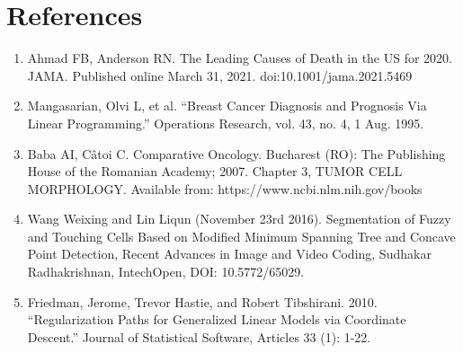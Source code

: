 \documentclass[10pt]{article}
\begin{document}
	
	 
\newpage
\section{References}

\begin{enumerate}
	\item Ahmad FB, Anderson RN. The Leading Causes of Death in the US for 2020. JAMA. Published online March 31, 2021. doi:10.1001/jama.2021.5469

	\item Mangasarian, Olvi L, et al. “Breast Cancer Diagnosis and Prognosis Via Linear Programming.” Operations Research, vol. 43, no. 4, 1 Aug. 1995. 
	
	\item Baba AI, Câtoi C. Comparative Oncology. Bucharest (RO): The Publishing House of the Romanian Academy; 2007. Chapter 3, TUMOR CELL MORPHOLOGY. Available from: https://www.ncbi.nlm.nih.gov/books
	
	\item Wang Weixing and Lin Liqun (November 23rd 2016). Segmentation of Fuzzy and Touching Cells Based on Modified Minimum Spanning Tree and Concave Point Detection, Recent Advances in Image and Video Coding, Sudhakar Radhakrishnan, IntechOpen, DOI: 10.5772/65029. 

	\item Friedman, Jerome, Trevor Hastie, and Robert Tibshirani. 2010. “Regularization Paths for Generalized Linear Models via Coordinate Descent.” Journal of Statistical Software, Articles 33 (1): 1-22. 
	
\end{enumerate}
	
	
	
\end{document}
